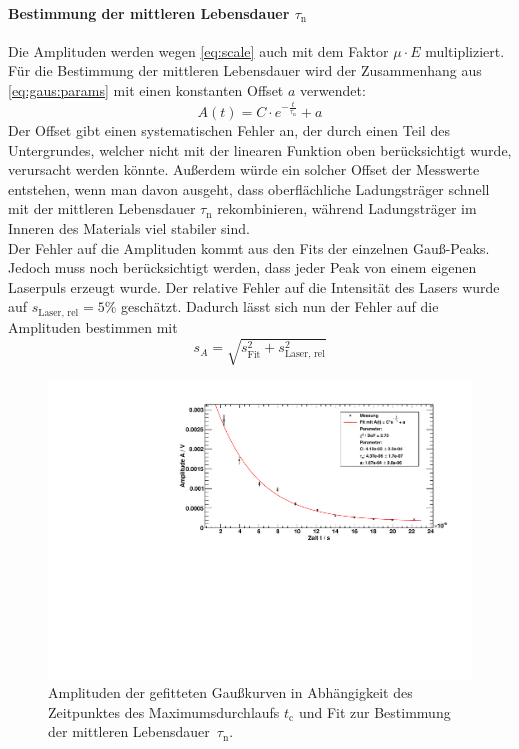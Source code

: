 \paragraph{Bestimmung der mittleren Lebensdauer $\tau_\text{n}$}
Die Amplituden werden wegen \autoref{eq:scale} auch mit dem Faktor $\mu \cdot E$ multipliziert. \\
Für die Bestimmung der mittleren Lebensdauer wird der Zusammenhang aus \autoref{eq:gaus:params} mit einen konstanten Offset $a$ verwendet:
\begin{equation}
  A(t) = C \cdot e^{- \frac{t}{\tau_\text{n}}} + a
\end{equation}
Der Offset gibt einen systematischen Fehler an, der durch einen Teil des Untergrundes, welcher nicht mit der linearen Funktion oben 
berücksichtigt wurde, verursacht werden könnte.
Außerdem würde ein solcher Offset der Messwerte entstehen, wenn man davon ausgeht, dass oberflächliche Ladungsträger
schnell mit der mittleren Lebensdauer $\tau_{\text{n}}$ rekombinieren, während Ladungsträger im Inneren des Materials viel stabiler sind.\\
Der Fehler auf die Amplituden kommt aus den Fits der einzelnen Gauß-Peaks. Jedoch muss noch berücksichtigt werden, dass jeder Peak von einem 
eigenen Laserpuls erzeugt wurde. Der relative Fehler auf die Intensität des Lasers wurde auf $s_\text{Laser, rel} = 5\%$ geschätzt. Dadurch 
lässt sich nun der Fehler auf die Amplituden bestimmen mit 
\begin{equation}
  s_A = \sqrt{s_\text{Fit}^2 + s_\text{Laser, rel}^2}
\end{equation}
\begin{figure}[H]
\begin{center}
  \includegraphics[width=\textwidth]{../img/part2/dist_fitA.pdf}
  \caption{Amplituden der gefitteten Gaußkurven in Abhängigkeit des Zeitpunktes des Maximumsdurchlaufs $t_{\text{c}}$
  und Fit zur Bestimmung der mittleren Lebensdauer~$\tau_{\text{n}}$.}
  \label{img:dist:fita}
\end{center}
\end{figure}
